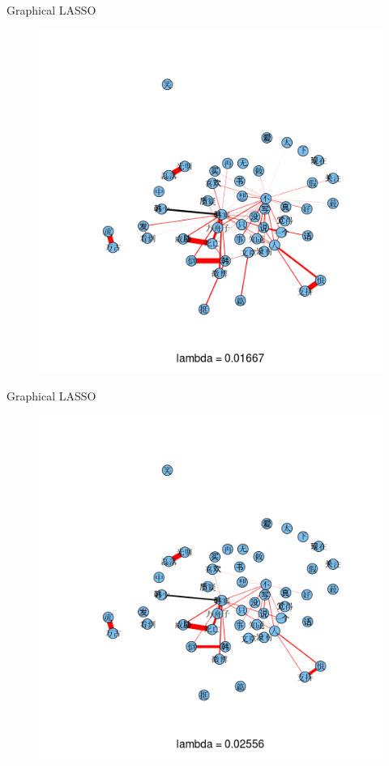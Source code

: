 \documentclass[12pt, trans]{beamer}
\newcommand{\1}[1]{{\mathbf 1}\left\{#1\right\}}        %
\begin{document}
\begin{frame}{Graphical LASSO}

\begin{figure}
  \centering
  \includegraphics[height=0.9\textheight]{./../../gLassoResults/glasso4.png} 
\end{figure}

\end{frame}
\begin{frame}{Graphical LASSO}

\begin{figure}
  \centering
  \includegraphics[height=0.9\textheight]{./../../gLassoResults/glasso5.png} 
\end{figure}

\end{frame}
\end{document}
